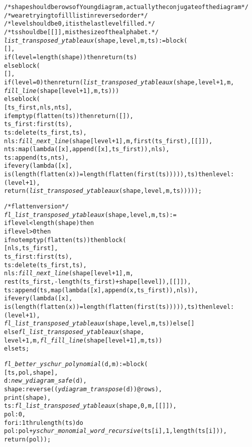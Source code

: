 \begin{alltt}
/* shape should be rows of Young diagram, actually the conjugate of the diagram */
/* we are trying to fill list in reversed order */
/* level should be 0, it is the last level filled. */
/* ts should be [[]], m is the size of the alphabet. */
\emph{list\_transposed\_ytableaux} (shape, level, m, ts) := block (
  [],
  if (level = length (shape)) then return (ts)
  else block (
    [],
    if (level = 0) then return (\emph{list\_transposed\_ytableaux} (shape, level + 1, m, 
      \emph{fill\_line} (shape[level + 1], m, ts)))
    else block (
      [ts\_first, nls, nts],
      if emptyp (flatten (ts)) then return ([]),
      ts\_first : first (ts),
      ts : delete (ts\_first, ts),
      nls : \emph{fill\_next\_line} (shape [level+1], m, first (ts_first), [[]]),
      nts : map (lambda ([x], append ([x], ts\_first)), nls),
      ts : append (ts, nts),
      if every (lambda ([x], 
        is (length (flatten (x)) = length (flatten (first (ts))))), ts) then level : (level + 1),
      return (\emph{list\_transposed\_ytableaux} (shape, level, m, ts)))));

/* flatten version */
\emph{fl\_list\_transposed\_ytableaux} (shape, level, m, ts) :=
if level < length (shape) then
if level > 0 then
if not emptyp (flatten (ts)) then block (
  [nls,ts\_first],
  ts\_first : first (ts),
  ts : delete (ts\_first, ts),
  nls : \emph{fill\_next\_line} (shape [level+1], m, 
    rest (ts\_first, - length (ts_first) + shape[level]), [[]]),
  ts : append (ts, map (lambda ([x], append (x, ts_first)), nls)),
  if every (lambda ([x], 
    is (length (flatten (x)) = length (flatten (first (ts))))), ts) then level : (level + 1),
  \emph{fl\_list\_transposed\_ytableaux} (shape, level, m, ts)) else []
else \emph{fl\_list\_transposed\_ytableaux} (shape, 
  level + 1, m, \emph{fl\_fill\_line} (shape[level + 1], m, ts))
else ts;

\emph{fl\_better\_yschur\_polynomial} (d, m) := block (
  [ts, pol, shape],
  d : \emph{new\_ydiagram\_safe} (d),
  shape : reverse ((\emph{ydiagram\_transpose} (d))@rows),
  print (shape),
  ts : \emph{fl\_list\_transposed\_ytableaux} (shape, 0, m, [[]]),
  pol : 0,
  for i : 1 thru length (ts) do 
    pol : pol + \emph{yschur\_monomial\_word\_recursive} (ts[i], 1, length (ts[i])),
  return (pol));
\end{alltt}
\small

